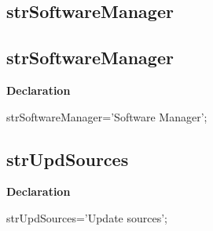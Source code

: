 \documentclass{report}
\newif\ifpdf
\begin{document}
\subsection*{\large{\textbf{strSoftwareManager}}\normalsize\hspace{1ex}\hrulefill}
\else
\subsection*{strSoftwareManager}
\fi
\label{trstrings-strSoftwareManager}
\begin{list}{}{
\setlength{\itemindent}{0cm}
\setlength{\listparindent}{0cm}
\setlength{\leftmargin}{\evensidemargin}
\addtolength{\leftmargin}{\tmplength}
\settowidth{\labelsep}{X}
\addtolength{\leftmargin}{\labelsep}
\setlength{\labelwidth}{\tmplength}
}
\item[\textbf{Declaration}\hfill]
\ifpdf
\begin{flushleft}
\fi
\begin{ttfamily}
strSoftwareManager='Software Manager';\end{ttfamily}

\ifpdf
\end{flushleft}
\fi

\end{list}
\ifpdf
\subsection*{\large{\textbf{strUpdSources}}\normalsize\hspace{1ex}\hrulefill}
\else
\subsection*{strUpdSources}
\fi
\label{trstrings-strUpdSources}
\begin{list}{}{
\setlength{\itemindent}{0cm}
\setlength{\listparindent}{0cm}
\setlength{\leftmargin}{\evensidemargin}
\addtolength{\leftmargin}{\tmplength}
\settowidth{\labelsep}{X}
\addtolength{\leftmargin}{\labelsep}
\setlength{\labelwidth}{\tmplength}
}
\item[\textbf{Declaration}\hfill]
\ifpdf
\begin{flushleft}
\fi
\begin{ttfamily}
strUpdSources='Update sources';\end{ttfamily}

\ifpdf
\end{flushleft}
\fi

\end{list}
\ifpdf
\end{document}
